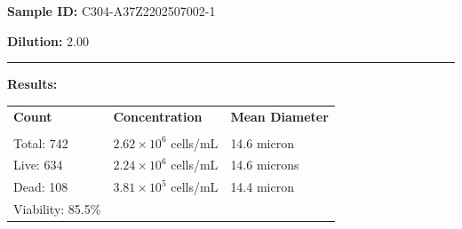 \documentclass[UTF8,10pt,a4paper,fontset=fandol]{ctexart}
\newcommand{\fieldvalue}[1]{#1}
\begin{document}
\medskip

\noindent
\textbf{Sample ID:}
\fieldvalue{C304-A37Z2202507002-1}

\noindent
\textbf{Dilution:}
\fieldvalue{2.00}

\medskip
\hrule
\medskip

\noindent
\textbf{Results:}

\medskip

\small
\begin{tabularx}{\textwidth}{@{}>{\raggedright\arraybackslash}X
                                >{\raggedright\arraybackslash}X
                                >{\raggedright\arraybackslash}X@{}}
\textbf{Count} & \textbf{Concentration} & \textbf{Mean Diameter} \\[1pt]
\underline{\hspace{3.2cm}} &
\underline{\hspace{3.2cm}} &
\underline{\hspace{3.2cm}} \\[3pt]

Total:
\fieldvalue{742}
&
\fieldvalue{$2.62\times10^{6}$ cells/mL}
&
\fieldvalue{14.6 micron}
\\[3pt]

Live:
\fieldvalue{634}
&
\fieldvalue{$2.24\times10^{6}$ cells/mL}
&
\fieldvalue{14.6 microns}
\\[3pt]

Dead:
\fieldvalue{108}
&
\fieldvalue{$3.81\times10^{5}$ cells/mL}
&
\fieldvalue{14.4 micron}
\\[3pt]

Viability:
\fieldvalue{85.5\%}
&
&
\end{tabularx}
\normalsize

\medskip
\end{document}
